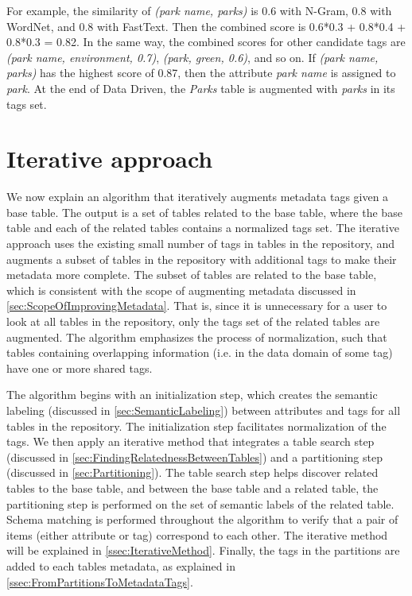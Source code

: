 For example, the similarity of \textit{(park name, parks)} is 0.6 with N-Gram, 0.8 with WordNet, and 0.8 with FastText. Then the combined score is 0.6*0.3 + 0.8*0.4 + 0.8*0.3 = 0.82. In the same way, the combined scores for other candidate tags are \textit{(park name, environment, 0.7)}, \textit{(park, green, 0.6)}, and so on. If \textit{(park name, parks)} has the highest score of 0.87, then the attribute \textit{park name} is assigned to \textit{park}. At the end of Data Driven, the \textit{Parks} table is augmented with \textit{parks} in its tags set.

\section{Iterative approach}
\label{sec:IterativeApproach}

We now explain an algorithm that iteratively augments metadata tags given a base table. The output is a set of tables related to the base table, where the base table and each of the related tables contains a normalized tags set. The iterative approach uses the existing small number of tags in tables in the repository, and augments a subset of tables in the repository with additional tags to make their metadata more complete. The subset of tables are related to the base table, which is consistent with the scope of augmenting metadata discussed in \autoref{sec:ScopeOfImprovingMetadata}. That is, since it is unnecessary for a user to look at all tables in the repository, only the tags set of the related tables are augmented. The algorithm emphasizes the process of normalization, such that tables containing overlapping information (i.e. in the data domain of some tag) have one or more shared tags.

The algorithm begins with an initialization step, which creates the semantic labeling (discussed in \autoref{sec:SemanticLabeling}) between attributes and tags for all tables in the repository. The initialization step facilitates normalization of the tags. We then apply an iterative method that integrates a table search step (discussed in \autoref{sec:FindingRelatednessBetweenTables}) and a partitioning step (discussed in \autoref{sec:Partitioning}). The table search step helps discover related tables to the base table, and between the base table and a related table, the partitioning step is performed on the set of semantic labels of the related table. Schema matching is performed throughout the algorithm to verify that a pair of items (either attribute or tag) correspond to each other. The iterative method will be explained in \autoref{ssec:IterativeMethod}. Finally, the tags in the partitions are added to each tables metadata, as explained in \autoref{ssec:FromPartitionsToMetadataTags}.

